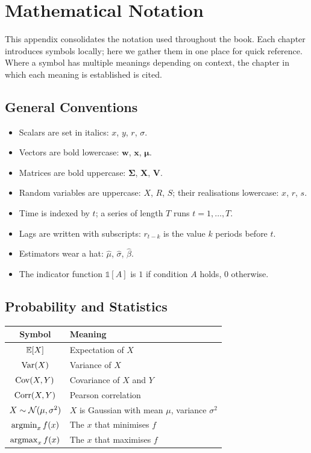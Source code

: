 \chapter{Mathematical Notation}
\label{app:notation}

This appendix consolidates the notation used throughout the book. Each
chapter introduces symbols locally; here we gather them in one place for
quick reference. Where a symbol has multiple meanings depending on
context, the chapter in which each meaning is established is cited.

\section{General Conventions}

\begin{itemize}
    \item Scalars are set in italics: $x$, $y$, $r$, $\sigma$.
    \item Vectors are bold lowercase: $\mathbf{w}$, $\mathbf{x}$, $\boldsymbol{\mu}$.
    \item Matrices are bold uppercase: $\boldsymbol{\Sigma}$, $\mathbf{X}$,
      $\mathbf{V}$.
    \item Random variables are uppercase: $X$, $R$, $S$; their realisations
      lowercase: $x$, $r$, $s$.
    \item Time is indexed by $t$; a series of length $T$ runs $t = 1, \dots, T$.
    \item Lags are written with subscripts: $r_{t-k}$ is the value $k$
      periods before $t$.
    \item Estimators wear a hat: $\hat{\mu}$, $\hat{\sigma}$, $\hat{\beta}$.
    \item The indicator function $\mathbb{1}[A]$ is $1$ if condition $A$
      holds, $0$ otherwise.
\end{itemize}

\section{Probability and Statistics}

\begin{center}
\begin{tabular}{cl}
\toprule
\textbf{Symbol} & \textbf{Meaning} \\
\midrule
$\mathbb{E}[X]$ & Expectation of $X$ \\
$\text{Var}(X)$ & Variance of $X$ \\
$\text{Cov}(X, Y)$ & Covariance of $X$ and $Y$ \\
$\text{Corr}(X, Y)$ & Pearson correlation \\
$X \sim \mathcal{N}(\mu, \sigma^2)$ & $X$ is Gaussian with mean $\mu$, variance $\sigma^2$ \\
$\operatorname*{argmin}_{x} f(x)$ & The $x$ that minimises $f$ \\
$\operatorname*{argmax}_{x} f(x)$ & The $x$ that maximises $f$ \\
\bottomrule
\end{tabular}
\end{center}

